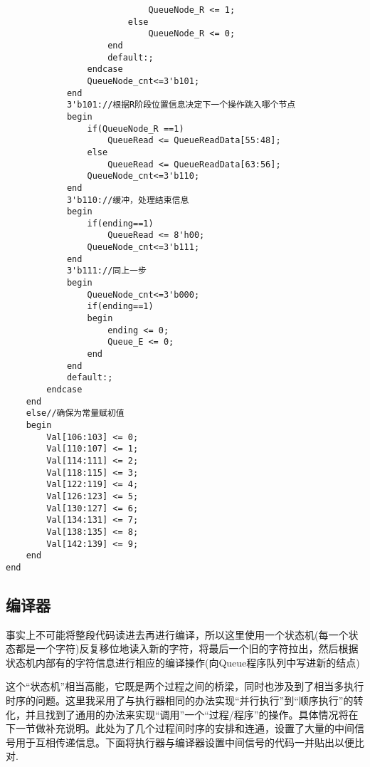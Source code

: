 \documentclass[lang=cn,11pt,a4paper]{elegantpaper}
\begin{document}
\begin{lstlisting}
                            QueueNode_R <= 1;
                        else
                            QueueNode_R <= 0;
                    end
                    default:;
                endcase
                QueueNode_cnt<=3'b101;
            end
            3'b101://根据R阶段位置信息决定下一个操作跳入哪个节点
            begin
                if(QueueNode_R ==1)
                    QueueRead <= QueueReadData[55:48];
                else
                    QueueRead <= QueueReadData[63:56];
                QueueNode_cnt<=3'b110;
            end
            3'b110://缓冲，处理结束信息
            begin	
                if(ending==1)
                    QueueRead <= 8'h00;
                QueueNode_cnt<=3'b111;
            end
            3'b111://同上一步
            begin
                QueueNode_cnt<=3'b000;
                if(ending==1)
                begin
                    ending <= 0;
                    Queue_E <= 0;
                end
            end
            default:;
        endcase
    end
    else//确保为常量赋初值
    begin
        Val[106:103] <= 0;
        Val[110:107] <= 1;
        Val[114:111] <= 2;
        Val[118:115] <= 3;
        Val[122:119] <= 4;
        Val[126:123] <= 5;
        Val[130:127] <= 6;
        Val[134:131] <= 7;
        Val[138:135] <= 8;
        Val[142:139] <= 9;
    end
end
\end{lstlisting}

\subsection{编译器}

事实上不可能将整段代码读进去再进行编译，所以这里使用一个状态机(每一个状态都是一个字符)反复移位地读入新的字符，将最后一个旧的字符拉出，然后根据状态机内部有的字符信息进行相应的编译操作(向Queue程序队列中写进新的结点)

这个“状态机”相当高能，它既是两个过程之间的桥梁，同时也涉及到了相当多执行时序的问题。这里我采用了与执行器相同的办法实现“并行执行”到“顺序执行”的转化，并且找到了通用的办法来实现“调用”一个“过程/程序”的操作。具体情况将在下一节做补充说明。此处为了几个过程间时序的安排和连通，设置了大量的中间信号用于互相传递信息。下面将执行器与编译器设置中间信号的代码一并贴出以便比对.
\end{document}
